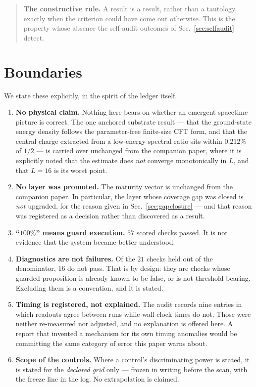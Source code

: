 \documentclass[11pt,a4paper]{article}
\begin{document}
\begin{quote}\small
\textbf{The constructive rule.} A result is a result, rather than a tautology,
exactly when the criterion could have come out otherwise. This is the property
whose absence the self-audit outcomes of Sec.~\ref{sec:selfaudit} detect.
\end{quote}

\section{Boundaries}
\label{sec:boundaries}

We state these explicitly, in the spirit of the ledger itself.

\begin{enumerate}[leftmargin=1.4em,itemsep=2pt]
  \item \textbf{No physical claim.} Nothing here bears on whether an emergent
        spacetime picture \cite{maldacena} is correct. The one anchored
        substrate result --- that the ground-state energy density follows the
        parameter-free finite-size CFT form, and that the central charge
        extracted from a low-energy spectral ratio sits within $0.212\%$ of
        $1/2$ --- is carried over unchanged from the companion paper, where it
        is explicitly noted that the estimate does \emph{not} converge
        monotonically in $L$, and that $L{=}16$ is its worst point.
  \item \textbf{No layer was promoted.} The maturity vector is unchanged from
        the companion paper. In particular, the layer whose coverage gap was
        closed is \emph{not} upgraded, for the reason given in
        Sec.~\ref{sec:gapclosure} --- and that reason was registered as a
        decision rather than discovered as a result.
  \item \textbf{``$100\%$'' means guard execution.} $57$ scored checks passed.
        It is not evidence that the system became better understood.
  \item \textbf{Diagnostics are not failures.} Of the $21$ checks held out of
        the denominator, $16$ do not pass. That is by design: they are checks
        whose guarded proposition is already known to be false, or is not
        threshold-bearing. Excluding them is a convention, and it is stated.
  \item \textbf{Timing is registered, not explained.} The audit records nine
        entries in which readouts agree between runs while wall-clock times do
        not. Those were neither re-measured nor adjusted, and no explanation is
        offered here. A report that invented a mechanism for its own timing
        anomalies would be committing the same category of error this paper
        warns about.
  \item \textbf{Scope of the controls.} Where a control's discriminating power
        is stated, it is stated for the \emph{declared grid} only --- frozen in
        writing before the scan, with the freeze line in the log. No
        extrapolation is claimed.
\end{enumerate}
\end{document}
